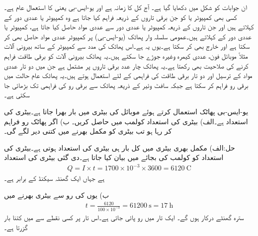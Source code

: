 ان جوابات کو شکل  میں دکھایا گیا ہے۔
آج کل  کا زمانہ ہے اور  یو-ایس-بی یعنی  کا استعمال عام ہے۔کسی بھی کمپیوٹر یا  کو  جن برقی تاروں کے ذریعہ فراہم کیا جاتا ہے وہ کمپیوٹر یا عددی دور کے  کہلاتے ہیں اور جن تاروں کے ذریعہ کمپیوٹر یا عددی دور سے عددی مواد حاصل کیا جاتا ہے، کمپیوٹر یا عددی دور کے   کہلاتے ہیں۔عمومی سلسلہ وار پھاٹک (یو-ایس-بی) پر کمپیوٹر عددی مواد حاصل بھی کر سکتا ہے اور خارج بھی  کر سکتا ہے۔یوں یہ  ہے۔اس پھاٹک کی مدد سے کمپیوٹر کے ساتھ بیرونی آلات مثلاً موبائل فون، عددی کیمرہ وغیرہ جوڑے جا سکتے ہیں۔یہ پھاٹک بیرونی آلات کو برقی طاقت فراہم کرنے کی صلاحیت بھی رکھتا ہے۔یہ پھاٹک چار عدد برقی تاروں پر مشتمل ہے جن میں دو تار عددی مواد کے ترسیل اور دو تار برقی طاقت کی فراہمی کے لئے استعمال ہوتے ہیں۔یہ پھاٹک عام حالت میں  برقی رو فراہم کر سکتا ہے جبکہ سافٹ وئیر کے ذریعہ پھاٹک سے برقی رو کی فراہمی  تک بڑھائی جا سکتی ہے۔

یو-ایس-بی پھاٹک استعمال کرتے ہوئے موبائل کی  بیٹری میں بار بھرا جاتا ہے۔بیٹری کی استعداد  ہے۔الف) بیٹری کی استعداد کولمب  میں حاصل کریں۔ ب) اگر پھاٹک  رو فراہم کر رہا ہو تب بیٹری کو مکمل بھرنے میں کتنی دیر لگے گی۔ 

حل:الف) مکمل بھری بیٹری میں کل بار ہی بیٹری کی استعداد ہوتی ہے۔بیٹری کی استعداد کو کولمب  کی بجائے  میں بیان کیا جاتا ہے۔دی گئی بیٹری کی استعداد
\begin{align*}
Q=I\times t=1700 \times 10^{-3} \times 3600=\SI{6120}{\coulomb}
\end{align*}
ہے جہاں ایک گھنٹہ   سیکنڈ کے برابر ہے۔ 

ب) یوں  کی رو سے بیٹری بھرنے میں
\begin{align*}
t=\frac{6120}{100\times 10^{-3}}=\SI{61200}{\second} =\SI{17}{\hour}
\end{align*}
سترہ گھنٹے درکار ہوں گے۔
ایک تار میں  رو پائی جاتی ہے۔اس تار پر کسی نقطے سے  میں کتنا بار گزرتا ہے۔

